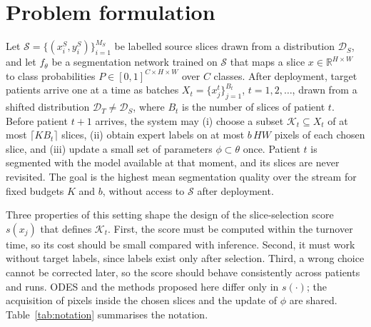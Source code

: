 \documentclass[a4paper,fleqn]{cas-dc}
\begin{document}
\section{Problem formulation}\label{sec:problem}
Let $\mathcal{S}=\{(x_i^S,y_i^S)\}_{i=1}^{M_S}$ be labelled source slices drawn from a distribution $\mathcal{D}_S$, and let $f_\theta$ be a segmentation network trained on $\mathcal{S}$ that maps a slice $x\in\mathbb{R}^{H\times W}$ to class probabilities $P\in[0,1]^{C\times H\times W}$ over $C$ classes. After deployment, target patients arrive one at a time as batches $X_t=\{x_j^t\}_{j=1}^{B_t}$, $t=1,2,\dots$, drawn from a shifted distribution $\mathcal{D}_T\neq\mathcal{D}_S$, where $B_t$ is the number of slices of patient $t$. Before patient $t+1$ arrives, the system may (i) choose a subset $\mathcal{K}_t\subseteq X_t$ of at most $\lceil K B_t\rceil$ slices, (ii) obtain expert labels on at most $b\,HW$ pixels of each chosen slice, and (iii) update a small set of parameters $\phi\subset\theta$ once. Patient $t$ is segmented with the model available at that moment, and its slices are never revisited. The goal is the highest mean segmentation quality over the stream for fixed budgets $K$ and $b$, without access to $\mathcal{S}$ after deployment.

Three properties of this setting shape the design of the slice-selection score $s(x_j)$ that defines $\mathcal{K}_t$. First, the score must be computed within the turnover time, so its cost should be small compared with inference. Second, it must work without target labels, since labels exist only after selection. Third, a wrong choice cannot be corrected later, so the score should behave consistently across patients and runs. ODES and the methods proposed here differ only in $s(\cdot)$; the acquisition of pixels inside the chosen slices and the update of $\phi$ are shared. Table~\ref{tab:notation} summarises the notation.
\end{document}
